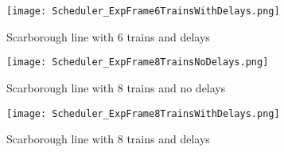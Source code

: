 \begin{figure}[tb]
	\centering
	\texttt{[image: Scheduler\_ExpFrame6TrainsWithDelays.png]}
	\caption{Scarborough line with 6 trains and delays}\label{fig:6trainsWithDelay}
\end{figure}

\begin{figure}[tb]
	\centering
	\texttt{[image: Scheduler\_ExpFrame8TrainsNoDelays.png]}
	\caption{Scarborough line with 8 trains and no delays}\label{fig:8trainsNoDelay}
\end{figure}

\begin{figure}[tb]
	\centering
	\texttt{[image: Scheduler\_ExpFrame8TrainsWithDelays.png]}
	\caption{Scarborough line with 8 trains and delays}\label{fig:8trainsWithDelay}
\end{figure}